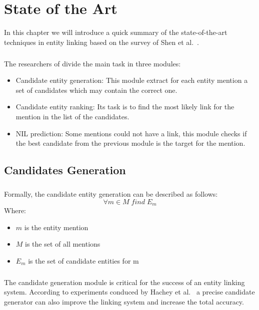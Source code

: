 \chapter{State of the Art}
In this chapter we will introduce a quick summary of the state-of-the-art techniques in entity linking based on the survey of Shen et al.~\cite{shen2015entity}.
\paragraph{}
The researchers of \cite{shen2015entity} divide the main task in three modules:
\begin{itemize}
\item Candidate entity generation: This module extract for each entity mention a set of candidates which may contain the correct one.
\item Candidate entity ranking: Its task is to find the most likely link for the mention in the list of the candidates.
\item NIL prediction: Some mentions could not have a link, this module checks if the best candidate from the previous module is the target for the mention. 
\end{itemize}

\section{Candidates Generation}
\paragraph{}
Formally, the candidate entity generation can be described as follows:
\begin{equation}
\forall m \in M \; find \; E_m
\end{equation}
Where:

\begin{itemize}[noitemsep,  topsep=10pt]
\item $m$ is the entity mention
\item $M$ is the set of all mentions
\item $E_m$ is the set of candidate entities for m
\end{itemize}

\pagebreak
\paragraph{} The candidate generation module is critical for the success of an entity linking system. According to experiments conduced by Hachey et al.~\cite{hachey2013evaluating} a precise candidate generator can also improve the linking system and increase the total accuracy.

